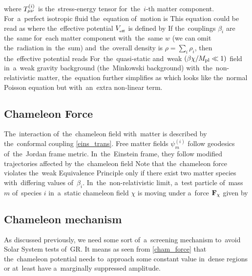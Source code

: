 where $T^{(i)}_{\mu\nu}$ is the~stress-energy tensor for~the~$i$-th matter component. For~a~perfect isotropic fluid the~equation of~motion is
This equation could be read as
where the~effective potential $V_{_\text{\tiny eff}}$ is defined by
If the~couplings $\beta_i$ are the~same for~each matter component with~the~same $w$ (we can omit the~radiation in~the~sum) and~the~overall density is $\rho=\sum_i\rho_i$, then the~effective potential reads
For~the~quasi-static and~weak $(\beta\chi/M_{\text{\scriptsize pl}}\ll1)$ field in~a~weak gravity background (the~Minkowski background) with~the~non-relativistic matter, the~equation further simplifies as
which looks like the~normal Poisson equation but with~an~extra non-linear term.
\subsection{Chameleon Force}
The~interaction of~the~chameleon field with~matter is described by the~conformal coupling \eqref{eins_trans}. Free matter fields $\psi_m^{(i)}$ follow geodesics of~the~Jordan frame metric. In~the~Einstein frame, they follow modified trajectories affected by the~chameleon field \parencite{Waterhouse:2006wv}
Note that the~chameleon force violates the~weak Equivalence Principle only if there exist two matter species with~differing values of~$\beta_i$. In~the~non-relativistic limit, a~test particle of~mass $m$ of~species $i$ in~a~static chameleon field $\chi$ is moving under a~force $\mathbf{F}_\chi$ given by
\subsection{Chameleon mechanism}
As discussed previously, we need some sort of~a~screening mechanism to~avoid Solar System tests of~GR. It means as seen from \eqref{cham_force} that the~chameleon potential needs to~approach some constant value in~dense regions or at~least have a~marginally suppressed amplitude.

